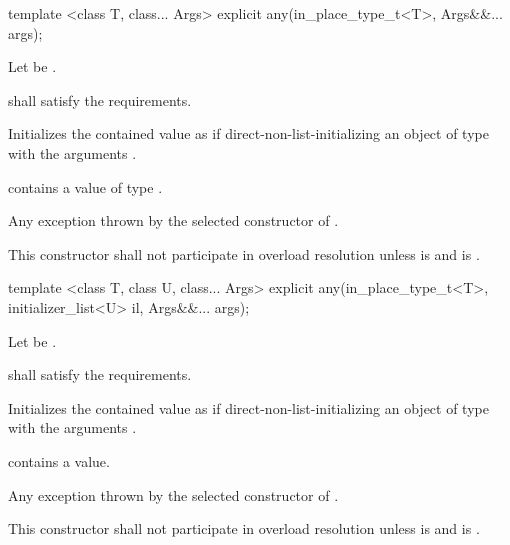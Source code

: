 %
\begin{itemdecl}
template <class T, class... Args>
  explicit any(in_place_type_t<T>, Args&&... args);
\end{itemdecl}

\begin{itemdescr}
\pnum
Let  be .

\pnum
\requires {} shall satisfy the  requirements.

\pnum
\effects Initializes the contained value as if direct-non-list-initializing an object of
type  with the arguments .

\pnum
\postconditions {} contains a value of type .

\pnum
\throws Any exception thrown by the selected constructor of .

\pnum
\remarks
This constructor shall not participate in overload resolution unless
 is  and
 is .
\end{itemdescr}

%
\begin{itemdecl}
template <class T, class U, class... Args>
  explicit any(in_place_type_t<T>, initializer_list<U> il, Args&&... args);
\end{itemdecl}

\begin{itemdescr}
\pnum
Let  be .

\pnum
\requires {} shall satisfy the  requirements.

\pnum
\effects Initializes the contained value as if direct-non-list-initializing an object of
type  with the arguments .

\pnum
\postconditions {} contains a value.

\pnum
\throws Any exception thrown by the selected constructor of .

\pnum
\remarks
This constructor shall not participate in overload resolution unless
 is  and
 is .
\end{itemdescr}

